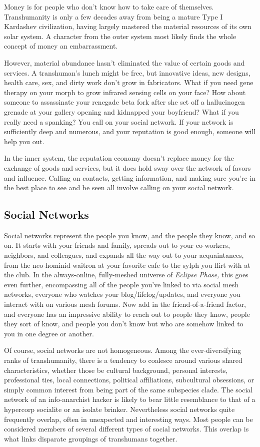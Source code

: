 Money is for people who don't know how to take 
care of themselves. Transhumanity is only a few decades
away from being a mature Type I Kardashev
civilization, having largely mastered the material 
resources of its own solar system. A character from 
the outer system most likely finds the whole concept 
of money an embarrassment.

However, material abundance hasn't eliminated 
the value of certain goods and services. A transhuman's
lunch might be free, but innovative ideas, new
designs, health care, sex, and dirty work don't grow 
in fabricators. What if you need gene therapy on your 
morph to grow infrared sensing cells on your face? 
How about someone to assassinate your renegade 
beta fork after she set off a hallucinogen grenade at 
your gallery opening and kidnapped your boyfriend? 
What if you really need a spanking? You call on your 
social network. If your network is sufficiently deep 
and numerous, and your reputation is good enough, 
someone will help you out.

In the inner system, the reputation economy doesn't 
replace money for the exchange of goods and services, 
but it does hold sway over the network of favors and 
influence. Calling on contacts, getting information, 
and making sure you're in the best place to see and be 
seen all involve calling on your social network.

\subsection{Social Networks}

Social networks represent the people you know, and 
the people they know, and so on. It starts with your 
friends and family, spreads out to your co-workers, 
neighbors, and colleagues, and expands all the way 
out to your acquaintances, from the neo-hominid 
waitron at your favorite cafe to the sylph you flirt 
with at the club. In the always-online, fully-meshed 
universe of \textit{Eclipse Phase,} this goes even further, 
encompassing all of the people you've linked to via 
social mesh networks, everyone who watches your 
blog/lifelog/updates, and everyone you interact with 
on various mesh forums. Now add in the friend-of-a-friend
factor, and everyone has an impressive ability
to reach out to people they know, people they sort of 
know, and people you don't know but who are somehow
linked to you in one degree or another.

Of course, social networks are not homogeneous. 
Among the ever-diversifying ranks of transhumanity, 
there is a tendency to coalesce around various shared 
characteristics, whether those be cultural background, 
personal interests, professional ties, local connections, 
political affiliations, subcultural obsessions, or simply 
common interest from being part of the same subspecies
clade. The social network of an info-anarchist
hacker is likely to bear little resemblance to that of 
a hypercorp socialite or an isolate brinker. Nevertheless
social networks quite frequently overlap, often
in unexpected and interesting ways. Most people can 
be considered members of several different types of 
social networks. This overlap is what links disparate 
groupings of transhumans together.

